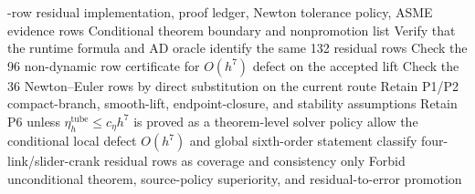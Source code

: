 \documentclass[10pt]{article}
\newcommand{\method}{Gauss6/FullVA}
\begin{document}
\begin{algorithm}[H]
\caption{Proof-sandbox audit for the \method{} route}
\label{alg:proof_audit}
\begin{algorithmic}[1]
-row residual implementation, proof ledger, Newton tolerance policy, ASME evidence rows
\Ensure Conditional theorem boundary and nonpromotion list
\State Verify that the runtime formula and AD oracle identify the same 132 residual rows
\State Check the 96 non-dynamic row certificate for $O(h^7)$ defect on the accepted lift
\State Check the 36 Newton--Euler rows by direct substitution on the current route
\State Retain P1/P2 compact-branch, smooth-lift, endpoint-closure, and stability assumptions
\State Retain P6 unless $\eta_h^{\mathrm{tube}}\le c_\eta h^7$ is proved as a theorem-level solver policy
  \State allow the conditional local defect $O(h^7)$ and global sixth-order statement
\EndIf
{}
  \State classify four-link/slider-crank residual rows as coverage and consistency only
\EndIf
\State Forbid unconditional theorem, source-policy superiority, and residual-to-error promotion
\end{algorithmic}
\end{algorithm}
\end{document}
